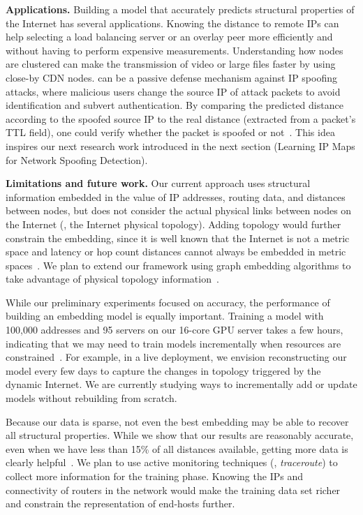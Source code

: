 \textbf{Applications.} Building a model that accurately predicts structural properties of the Internet has several applications. Knowing the distance to remote IPs can help selecting a load balancing server or an overlay peer more efficiently and without having to perform expensive measurements. Understanding how nodes are clustered can make the transmission of video or large files faster by using close-by CDN nodes. 
%
\system{} can be a passive defense mechanism against IP spoofing attacks, where malicious users change the source IP of attack packets to avoid identification and subvert authentication. By comparing the predicted distance according to the spoofed source IP to the real distance (extracted from a packet's TTL field), one could verify whether the packet is spoofed or not~\citep{hc-filter}.  This idea inspires our next research work introduced in the next section  (Learning IP Maps for Network Spoofing Detection).  



\textbf{Limitations and future work.}
Our current approach uses structural information embedded in the value of IP addresses, routing data, and distances between nodes, but does not consider the actual physical links between nodes on the Internet (\ie, the Internet physical topology). Adding topology would further constrain the embedding, since it is well known that the Internet is not a metric space and latency or hop count distances cannot always be embedded in metric spaces~\citep{vivaldi}. We plan to extend our framework using graph embedding algorithms to take advantage of physical topology information~\citep{dn-emb}.

While our preliminary experiments focused on accuracy, the performance of building an embedding model is equally important. Training a model with 100,000 addresses and 95 servers on our 16-core GPU server takes a few hours, indicating that we may need to train models incrementally when resources are constrained~\citep{bruzzone1999incremental}. For example, in a live deployment, we envision reconstructing our model every few days to capture the changes in topology triggered by the dynamic Internet. We are currently studying ways to incrementally add or update models without rebuilding from scratch.

Because our data is sparse, not even the best embedding may be able to recover all structural properties. While we show that our results are reasonably accurate, even when we have less than 15\% of all distances available, getting more data is clearly helpful~\citep{barford-infocom}. We plan to use active monitoring techniques (\eg{}, {\em traceroute}) to collect more information for the training phase. Knowing the IPs and connectivity of routers in the network would make the training data set richer and constrain the representation of end-hosts further.


